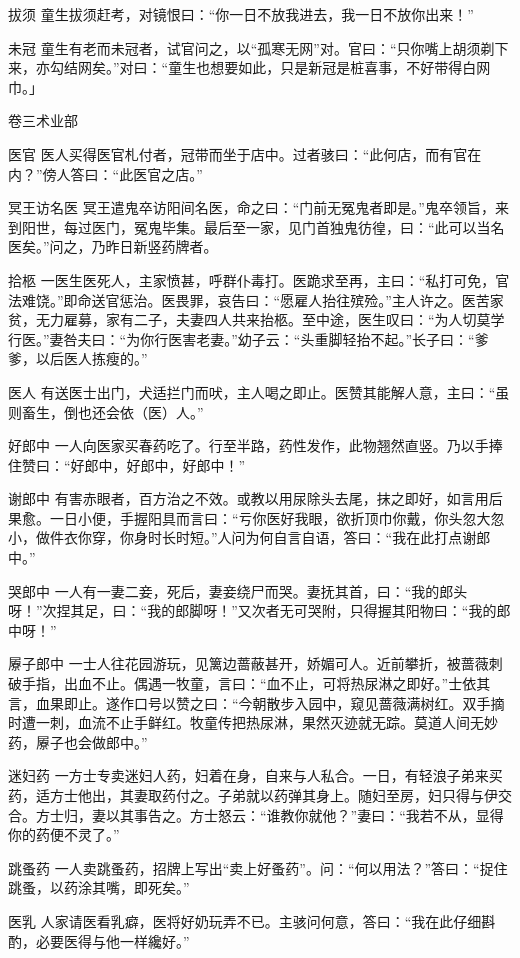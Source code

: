\documentclass[12pt,UTF8]{ctexbook}
\begin{document}
拔须
童生拔须赶考，对镜恨曰：“你一日不放我进去，我一日不放你出来！”

未冠
童生有老而未冠者，试官问之，以“孤寒无网”对。官曰：“只你嘴上胡须剃下来，亦勾结网矣。”对曰：“童生也想要如此，只是新冠是桩喜事，不好带得白网巾。」

卷三术业部

医官
医人买得医官札付者，冠带而坐于店中。过者骇曰：“此何店，而有官在内？”傍人答曰：“此医官之店。”

冥王访名医
冥王遣鬼卒访阳间名医，命之曰：“门前无冤鬼者即是。”鬼卒领旨，来到阳世，每过医门，冤鬼毕集。最后至一家，见门首独鬼彷徨，曰：“此可以当名医矣。”问之，乃昨日新竖药牌者。

拾柩
一医生医死人，主家愤甚，呼群仆毒打。医跪求至再，主曰：“私打可免，官法难饶。”即命送官惩治。医畏罪，哀告曰：“愿雇人抬往殡殓。”主人许之。医苦家贫，无力雇募，家有二子，夫妻四人共来抬柩。至中途，医生叹曰：“为人切莫学行医。”妻咎夫曰：“为你行医害老妻。”幼子云：“头重脚轻抬不起。”长子曰：“爹爹，以后医人拣瘦的。”

医人
有送医士出门，犬适拦门而吠，主人喝之即止。医赞其能解人意，主曰：“虽则畜生，倒也还会依（医）人。”

好郎中
一人向医家买春药吃了。行至半路，药性发作，此物翘然直竖。乃以手捧住赞曰：“好郎中，好郎中，好郎中！”

谢郎中
有害赤眼者，百方治之不效。或教以用尿除头去尾，抹之即好，如言用后果愈。一日小便，手握阳具而言曰：“亏你医好我眼，欲折顶巾你戴，你头忽大忽小，做件衣你穿，你身时长时短。”人问为何自言自语，答曰：“我在此打点谢郎中。”

哭郎中
一人有一妻二妾，死后，妻妾绕尸而哭。妻抚其首，曰：“我的郎头呀！”次捏其足，曰：“我的郎脚呀！”又次者无可哭附，只得握其阳物曰：“我的郎中呀！”

屪子郎中
一士人往花园游玩，见篱边蔷蔽甚开，娇媚可人。近前攀折，被蔷薇刺破手指，出血不止。偶遇一牧童，言曰：“血不止，可将热尿淋之即好。”士依其言，血果即止。遂作口号以赞之曰：“今朝散步入园中，窥见蔷薇满树红。双手摘时遭一刺，血流不止手鲜红。牧童传把热尿淋，果然灭迹就无踪。莫道人间无妙药，屪子也会做郎中。”

迷妇药
一方士专卖迷妇人药，妇着在身，自来与人私合。一日，有轻浪子弟来买药，适方士他出，其妻取药付之。子弟就以药弹其身上。随妇至房，妇只得与伊交合。方士归，妻以其事告之。方士怒云：“谁教你就他？”妻曰：“我若不从，显得你的药便不灵了。”

跳蚤药
一人卖跳蚤药，招牌上写出“卖上好蚤药”。问：“何以用法？”答曰：“捉住跳蚤，以药涂其嘴，即死矣。”

医乳
人家请医看乳癖，医将好奶玩弄不已。主骇问何意，答曰：“我在此仔细斟酌，必要医得与他一样纔好。”
\end{document}
